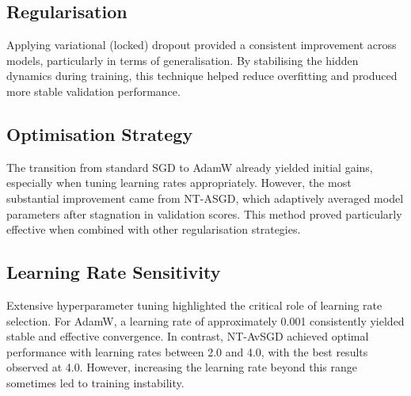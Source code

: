 \documentclass[a4paper]{article}
\begin{document}
\subsection{Regularisation}
Applying variational (locked) dropout provided a consistent improvement across models, particularly in terms of generalisation. By stabilising the hidden dynamics during training, this technique helped reduce overfitting and produced more stable validation performance.

\subsection{Optimisation Strategy}
The transition from standard SGD to AdamW already yielded initial gains, especially when tuning learning rates appropriately. However, the most substantial improvement came from NT-ASGD, which adaptively averaged model parameters after stagnation in validation scores. This method proved particularly effective when combined with other regularisation strategies.

\subsection{Learning Rate Sensitivity}
Extensive hyperparameter tuning highlighted the critical role of learning rate selection. For AdamW, a learning rate of approximately 0.001 consistently yielded stable and effective convergence. In contrast, NT-AvSGD achieved optimal performance with learning rates between 2.0 and 4.0, with the best results observed at 4.0. However, increasing the learning rate beyond this range sometimes led to training instability.




\onecolumn

\end{document}

